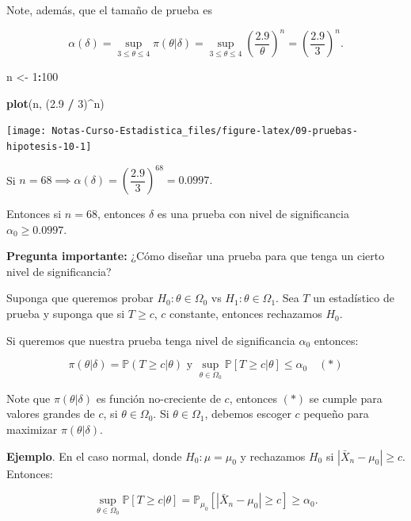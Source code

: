 \documentclass[
  12pt,
]{book}
\newenvironment{Shaded}{\begin{snugshade}}{\end{snugshade}}
\newcommand{\DecValTok}[1]{\textcolor[rgb]{0.00,0.00,0.81}{#1}}
\newcommand{\FloatTok}[1]{\textcolor[rgb]{0.00,0.00,0.81}{#1}}
\newcommand{\KeywordTok}[1]{\textcolor[rgb]{0.13,0.29,0.53}{\textbf{#1}}}
\newcommand{\NormalTok}[1]{#1}
\newcommand{\OperatorTok}[1]{\textcolor[rgb]{0.81,0.36,0.00}{\textbf{#1}}}
\newcommand{\StringTok}[1]{\textcolor[rgb]{0.31,0.60,0.02}{#1}}
\begin{document}
Note, además, que el tamaño de prueba es

\[\alpha(\delta) = \sup_{3\leq\theta\leq 4} \pi(\theta|\delta) =
\sup_{3\leq\theta\leq 4}\left(\dfrac{2.9}{\theta}\right)^n =
\left(\dfrac{2.9}{3}\right)^n.\]

\begin{Shaded}
\begin{Highlighting}[]
\NormalTok{n \textless{}{-}}\StringTok{ }\DecValTok{1}\OperatorTok{:}\DecValTok{100}

\KeywordTok{plot}\NormalTok{(n, (}\FloatTok{2.9} \OperatorTok{/}\StringTok{ }\DecValTok{3}\NormalTok{)}\OperatorTok{\^{}}\NormalTok{n)}
\end{Highlighting}
\end{Shaded}

\begin{center}\texttt{[image: Notas-Curso-Estadistica\_files/figure-latex/09-pruebas-hipotesis-10-1]} \end{center}

Si \(n = 68 \implies \alpha(\delta)= \left(\dfrac{2.9}{3}\right)^{68} = 0.0997.\)

Entonces si \(n = 68\), entonces \(\delta\) es una prueba con nivel de
significancia \(\alpha_0\geq 0.0997\).

\textbf{Pregunta importante:} ¿Cómo diseñar una prueba para que tenga un cierto nivel
de significancia?

Suponga que queremos probar \(H_0: \theta \in \Omega_0\) vs \(H_1: \theta\in\Omega_1\). Sea \(T\) un estadístico de prueba y suponga que si \(T\geq c\),
\(c\) constante, entonces rechazamos \(H_0\).

Si queremos que nuestra prueba tenga nivel de significancia \(\alpha_0\) entonces:

\[\pi(\theta|\delta) = \mathbb P(T\geq c|\theta)\text{ y } \sup_{\theta \in
\Omega_0}\mathbb P[T\geq c|\theta] \leq \alpha_0 \quad (*)\]

Note que \(\pi(\theta|\delta)\) es función no-creciente de \(c\), entonces \((*)\) se
cumple para valores grandes de \(c\), si \(\theta\in\Omega_0\). Si \(\theta \in \Omega_1\), debemos escoger \(c\) pequeño para maximizar \(\pi(\theta|\delta)\).

\textbf{Ejemplo}. En el caso normal, donde \(H_0: \mu = \mu_0\) y rechazamos \(H_0\) si
\(|\bar X_n-\mu_0|\geq c\). Entonces:

\[\sup_{\theta\in\Omega_0} \mathbb P [T\geq c|\theta] = \mathbb P_{\mu_0}[|\bar
X_n-\mu_0|\geq c]\geq \alpha_0.\]
\end{document}
